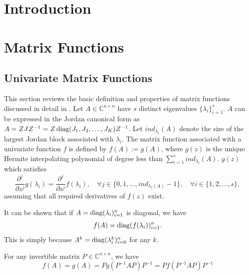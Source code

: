 \section{Introduction}


\newpage
\section{Matrix Functions}

\subsection{Univariate Matrix Functions}
This section reviews the basic definition and properties of matrix functions
discussed in detail in \cite{higham2008functions}.
Let $A \in \mathbb{C}^{n \times n}$ have $s$ distinct eigenvalues $\{\lambda_i\}_{i=1}^{s}$.
$A$ can be expressed in the Jordan canonical form as $A = ZJZ^{-1} = Z \operatorname{diag}(J_1, J_2, \dots, J_K)
Z^{-1}$. Let $ind_{\lambda_i}(A)$ denote the size of the largest Jordan block associated
with $\lambda_i$. The matrix function associated with a univariate function $f$
is defined by $f(A) := g(A)$, where $g(z)$ is the unique Hermite interpolating
polynomial of degree less than $\sum_{i=1}^{s}{ind_{\lambda_i}(A)}$. $g(z)$ which
satisfies
\begin{equation}
    \frac{\partial^j}{\partial z^j}g(\lambda_i) = \frac{\partial^j}{\partial z^j}f(\lambda_i),
    \quad \forall j \in \{0, 1, \dots, ind_{\lambda_i(A)}-1\},
    \quad \forall i \in \{1, 2, \dots, s\},
\end{equation}
assuming that all required derivatives of $f(z)$ exist.

It can be shown that if $A = \operatorname{diag}(\lambda_i)_{i=1}^{n}$ is diagonal, we have
\begin{equation}
    \label{eq:matrixfunctiondiagonal}
    f(A) = \operatorname{diag}(f(\lambda_i))_{i=1}^{n}.
\end{equation}
This is simply because $A^k = \operatorname{diag}(\lambda_i^k)_{i=0}^{n}$ for any $k$.

For any invertible matrix $P \in \mathbb{C}^{n \times n}$, we have
\begin{equation}
    \label{eq:matrixfunctioninvertible}
    f(A) = g(A) = Pg(P^{-1}AP)P^{-1} = Pf(P^{-1}AP)P^{-1}
\end{equation}

